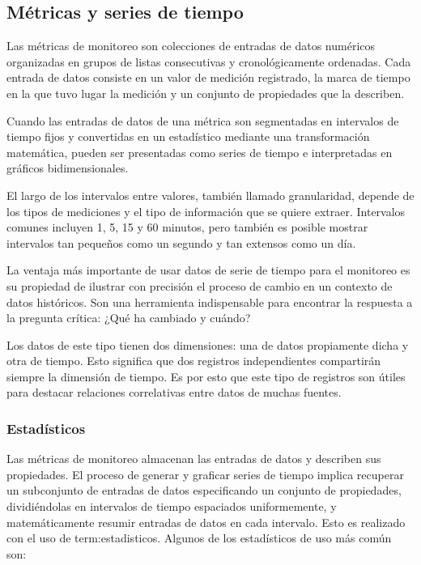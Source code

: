 \subsection{Métricas y series de tiempo}
\label{metricas_y_timeseries}
Las métricas de monitoreo son colecciones de entradas de datos numéricos
organizadas en grupos de listas consecutivas y cronológicamente ordenadas. Cada
entrada de datos consiste en un valor de medición registrado, la marca de
tiempo en la que tuvo lugar la medición y un conjunto de propiedades que la
describen.

Cuando las entradas de datos de una métrica son segmentadas en intervalos de
tiempo fijos y convertidas en un estadístico mediante una transformación
matemática, pueden ser presentadas como series de tiempo e interpretadas en
gráficos bidimensionales.

El largo de los intervalos entre valores, también llamado granularidad, depende
de los tipos de mediciones y el tipo de información que se quiere extraer.
Intervalos comunes incluyen 1, 5, 15 y 60 minutos, pero también es posible
mostrar intervalos tan pequeños como un segundo y tan extensos como un día.

La ventaja más importante de usar datos de serie de tiempo para el monitoreo es
su propiedad de ilustrar con precisión el proceso de cambio en un contexto de
datos históricos. Son una herramienta indispensable para encontrar la respuesta
a la pregunta crítica: ¿Qué ha cambiado y cuándo?

Los datos de este tipo tienen dos dimensiones: una de datos propiamente dicha y
otra de tiempo. Esto significa que dos registros independientes compartirán
siempre la dimensión de tiempo. Es por esto que este tipo de registros son
útiles para destacar relaciones correlativas entre datos de muchas fuentes.

\subsubsection*{Estadísticos}
\label{estadisticos}

Las métricas de monitoreo almacenan las entradas de datos y describen sus
propiedades. El proceso de generar y graficar series de tiempo implica
recuperar un subconjunto de entradas de datos especificando un conjunto de
propiedades, dividiéndolas en intervalos de tiempo espaciados uniformemente, y
matemáticamente resumir entradas de datos en cada intervalo. Esto es realizado
con el uso de \glspl{term:estadistico}. Algunos de los estadísticos de uso más
común son:

